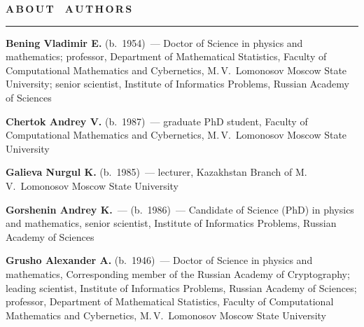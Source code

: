 \def\stat{authors}
{%
\raggedleft\Large \bf%
A\,B\,O\,U\,T\  \  A\,U\,T\,H\,O\,R\,S \vskip 17pt
    \hrule
    \par
{} }

\label{st\stat}


\def\leftkol{\ } %
\def\rightkol{ABOUT AUTHORS} %


\vspace*{48pt}

\begin{multicols}{2}





\noindent
\textbf{Bening Vladimir E.} (b.\ 1954)~--- Doctor of Science in physics 
and mathematics; professor, Department of Mathematical Statistics, 
Faculty of Computational Mathematics and Cybernetics, 
M.\,V.~Lomonosov Moscow State University; senior scientist, 
Institute of Informatics Problems, Russian Academy of Sciences

\vspace*{4pt}

\noindent
\textbf{Chertok Andrey V.} (b.\ 1987)~---  graduate PhD student, Faculty of Computational 
Mathematics and Cybernetics, M.\,V.~Lomonosov Moscow State University

\vspace*{4pt}

\noindent
\textbf{Galieva Nurgul K.} (b.\ 1985)~--- lecturer, Kazakhstan Branch of M.\,V.~Lomonosov 
Moscow State University

\vspace*{4pt}

\noindent
\textbf{Gorshenin Andrey K.}~--- (b.\ 1986)~--- Candidate of Science (PhD)
in physics and mathematics,
senior scientist, Institute of Informatics Problems, Russian Academy of Sciences

\vspace*{4pt}

\noindent
\textbf{Grusho Alexander A.} (b.\ 1946)~--- Doctor of Science in physics and mathematics, 
Corresponding member of the Russian Academy of Cryptography; leading scientist, Institute 
of Informatics Problems, Russian Academy of Sciences; professor, Department of Mathematical 
Statistics, Faculty of Computational Mathematics and Cybernetics, 
M.\,V.~Lomonosov Moscow State Univer\-sity 

\vspace*{4pt}


\end{multicols}
